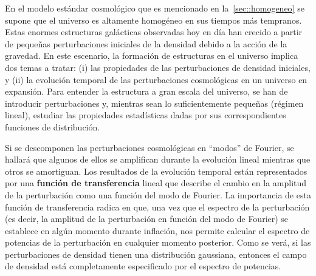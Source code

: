 En el modelo estándar cosmológico que es mencionado en la~\autoref{sec::homogeneo} se supone que el universo es altamente homogéneo en sus tiempos más tempranos. Estas enormes estructuras galácticas observadas hoy en día han crecido a partir de pequeñas perturbaciones iniciales de la densidad debido a la acción de la gravedad. En este escenario, la formación de estructuras en el universo implica dos temas a tratar: (i) las propiedades de las perturbaciones de densidad iniciales, y (ii) la evolución temporal de las perturbaciones cosmológicas en un universo en expansión. Para entender la estructura a gran escala del universo, se han de introducir perturbaciones y, mientras sean lo suficientemente pequeñas (régimen lineal), estudiar las propiedades estadísticas dadas por sus correspondientes funciones de distribución.

Si se descomponen las perturbaciones cosmológicas en ``modos'' de Fourier, se hallará que algunos de ellos se amplifican durante la evolución lineal mientras que otros se amortiguan. Los resultados de la evolución temporal están representados por una \textbf{función de transferencia} lineal que describe el cambio en la amplitud de la perturbación como una función del modo de Fourier. La importancia de esta función de transferencia radica en que, una vez que el espectro de la perturbación (es decir, la amplitud de la perturbación en función del modo de Fourier) se establece en algún momento durante inflación, nos permite calcular el espectro de potencias de la perturbación en cualquier momento posterior. Como se verá, si las perturbaciones de densidad tienen una distribución gaussiana, entonces el campo de densidad está completamente especificado por el espectro de potencias.
